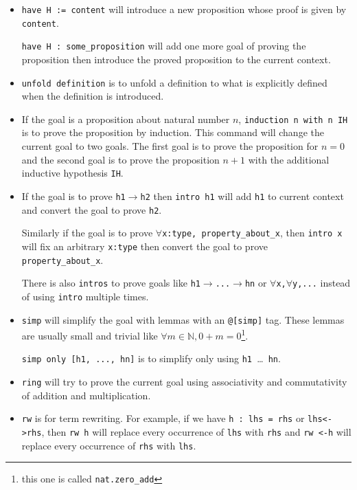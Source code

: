 \documentclass{report}
\theoremstyle{definition}
\theoremstyle{plain}
\begin{document}
\begin{itemize}
  \item \texttt{have H := content} will introduce a new proposition whose proof is given by {\tt content}.
  
  \texttt{have H : some_proposition} will add one more goal of proving the proposition then introduce the proved proposition to the current context.

  \item {\tt unfold definition} is to unfold a definition to what is explicitly defined when the definition is introduced.
  \item If the goal is a proposition about natural number $n$, {\tt induction n with n IH} is to prove the proposition by induction. This command will change the current goal to two goals. The first goal is to prove the proposition for $n=0$ and the second goal is to prove the proposition $n+1$ with the additional inductive hypothesis {\tt IH}.
  \item If the goal is to prove {\tt h1$\to$h2} then \texttt{intro h1} will add {\tt h1} to current context and convert the goal to prove {\tt h2}.
  
  Similarly if the goal is to prove {\tt $\forall $x:type, property\_about\_x}, then {\tt intro x} will fix an arbitrary {\tt x:type} then convert the goal to prove {\tt property\_about\_x}.

  There is also {\tt intros} to prove goals like {\tt h1$\to$...$\to$hn} or {\tt $\forall$x,$\forall$y,...} instead of using {\tt intro} multiple times.

  \item {\tt simp} will simplify the goal with lemmas with an \texttt{@[simp]} tag. These lemmas are usually small and trivial like $\forall m\in\mathbb N, 0+m=0$\footnote{this one is called {\tt nat.zero\_add}}.
  
  \texttt{simp only [h1, ..., hn]} is to simplify only using {\tt h1 }\dots{\tt{ hn}}.
  \item {\tt ring} will try to prove the current goal using associativity and commutativity of addition and multiplication.
  \item {\tt rw} is for term rewriting. For example, if we have \texttt{h : lhs = rhs} or \texttt{lhs<->rhs}, then \texttt{rw h} will replace every occurrence of {\tt lhs} with {\tt rhs} and \texttt{rw <-h} will replace every occurrence of {\tt rhs} with {\tt lhs}. 
  

\end{itemize}
\end{document}
